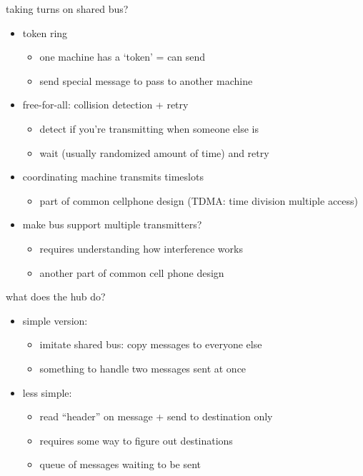 \begin{frame}{taking turns on shared bus?}
    \begin{itemize}
    \item token ring
        \begin{itemize}
        \item one machine has a `token' = can send
        \item send special message to pass to another machine
        \end{itemize}
    \item free-for-all: collision detection + retry
        \begin{itemize}
        \item detect if you're transmitting when someone else is
        \item wait (usually randomized amount of time) and retry
        \end{itemize}
    \item coordinating machine transmits timeslots
        \begin{itemize}
        \item part of common cellphone design (TDMA: time division multiple access)
        \end{itemize}
    \item make bus support multiple transmitters?
        \begin{itemize}
        \item requires understanding how interference works
        \item another part of common cell phone design
        \end{itemize}
    \end{itemize}
\end{frame}


\begin{frame}{what does the hub do?}
    \begin{itemize}
    \item simple version:
        \begin{itemize}
        \item imitate shared bus: copy messages to everyone else
        \item something to handle two messages sent at once
        \end{itemize}
    \item less simple:
        \begin{itemize}
        \item read ``header'' on message + send to destination only
        \item requires some way to figure out destinations
        \item queue of messages waiting to be sent
        \end{itemize}
    \end{itemize}
\end{frame}

